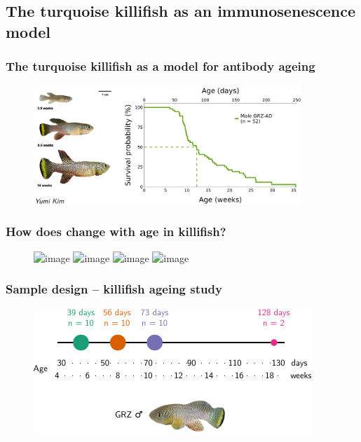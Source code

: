 \documentclass[presentation]{beamer}
\newlength{\slideheight}
\begin{document}
\blackslide

\subsection{The turquoise killifish as an immunosenescence model}

\begin{frame}
\frametitle{The turquoise killifish as a model for antibody ageing}
\begin{figure}
\includegraphics[width=0.9\textwidth]{figs/pdf/intro-turquoise-killifish}
\end{figure}
\end{frame}

\begin{frame}
\frametitle{How does  change with age in killifish?}
\begin{figure}
\includegraphics<2>[height=\slideheight]{figs/pdf/antibody-structure}
\includegraphics<3>[width=\textwidth]{figs/pdf/aims-1}
\includegraphics<4>[width=\textwidth]{figs/pdf/aims-2}
\includegraphics<5>[width=\textwidth]{figs/pdf/aims}
\end{figure}
\end{frame}

\begin{frame}
\frametitle{Sample design -- killifish ageing study}
\begin{figure}
\includegraphics[width=\textwidth]{figs/pdf/design-ageing}
\end{figure}
\end{frame}
\end{document}

